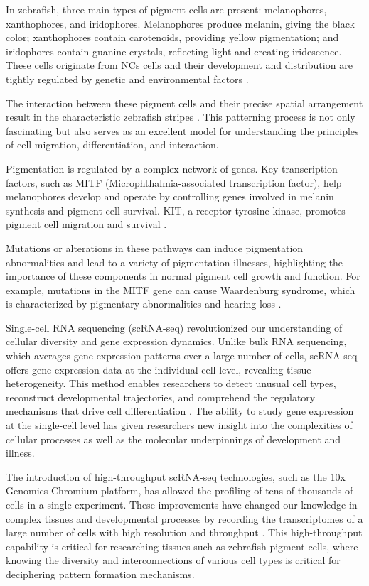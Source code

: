 \documentclass[runningheads]{llncs}
\begin{document}
In zebrafish, three main types of pigment cells are present: melanophores, xanthophores, and iridophores. Melanophores produce melanin, giving the black color; xanthophores contain carotenoids, providing yellow pigmentation; and iridophores contain guanine crystals, reflecting light and creating iridescence. These cells originate from NCs cells and their development and distribution are tightly regulated by genetic and environmental factors \cite{fabian2022lifelong,patterson2019zebrafish}.

The interaction between these pigment cells and their precise spatial arrangement result in the characteristic zebrafish stripes \cite{patterson2019zebrafish}. This patterning process is not only fascinating but also serves as an excellent model for understanding the principles of cell migration, differentiation, and interaction.

Pigmentation is regulated by a complex network of genes. Key transcription factors, such as MITF (Microphthalmia-associated transcription factor), help melanophores develop and operate by controlling genes involved in melanin synthesis and pigment cell survival. KIT, a receptor tyrosine kinase, promotes pigment cell migration and survival \cite{kenny2022tfap2,jang2021epigenetic}. 

Mutations or alterations in these pathways can induce pigmentation abnormalities and lead to a variety of pigmentation illnesses, highlighting the importance of these components in normal pigment cell growth and function. For example, mutations in the MITF gene can cause Waardenburg syndrome, which is characterized by pigmentary abnormalities and hearing loss \cite{kenny2022tfap2,huang2022genetic}.

Single-cell RNA sequencing (scRNA-seq) revolutionized our understanding of cellular diversity and gene expression dynamics. Unlike bulk RNA sequencing, which averages gene expression patterns over a large number of cells, scRNA-seq offers gene expression data at the individual cell level, revealing tissue heterogeneity. This method enables researchers to detect unusual cell types, reconstruct developmental trajectories, and comprehend the regulatory mechanisms that drive cell differentiation \cite{nayak2021hitchhiker}. The ability to study gene expression at the single-cell level has given researchers new insight into the complexities of cellular processes as well as the molecular underpinnings of development and illness.

The introduction of high-throughput scRNA-seq technologies, such as the 10x Genomics Chromium platform, has allowed the profiling of tens of thousands of cells in a single experiment. These improvements have changed our knowledge in complex tissues and developmental processes by recording the transcriptomes of a large number of cells with high resolution and throughput \cite{stuart2019comprehensive,lencer2021single}. This high-throughput capability is critical for researching tissues such as zebrafish pigment cells, where knowing the diversity and interconnections of various cell types is critical for deciphering pattern formation mechanisms\cite{jang2021epigenetic,budi2008embryonic,camargo2019endothelin}.
\end{document}
